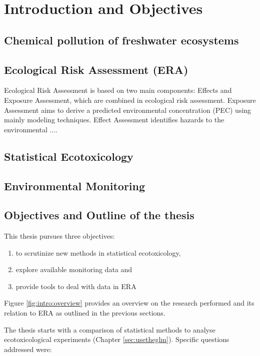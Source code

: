 \chapter{Introduction and Objectives}
\label{sec:introduction} 

\section{Chemical pollution of freshwater ecosystems}

\section{Ecological Risk Assessment (ERA)}
Ecological Risk Assessment is based on two main components: Effects and Exposure Assessment, which are combined in ecological risk assessment.
Exposure Assessment aims to derive a predicted environmental concentration (PEC) using mainly modeling techniques.
Effect Assessment identifies hazards to the environmental ....

\section{Statistical Ecotoxicology}

\section{Environmental Monitoring}




\section{Objectives and Outline of the thesis}
This thesis pursues three objectives: 
\begin{enumerate}[i]
	\item to scrutinize new methods in statistical ecotoxicology,
	\item explore available monitoring data and
	\item provide tools to deal with data in ERA
\end{enumerate}
Figure \ref{fig:intro:overview} provides an overview on the research performed and its relation to ERA as outlined in the previous sections.

\noindent
The thesis starts with a comparison of statistical methods to analyse ecotoxicological experiments (Chapter \ref{sec:usetheglm}). 
Specific questions addressed were:

